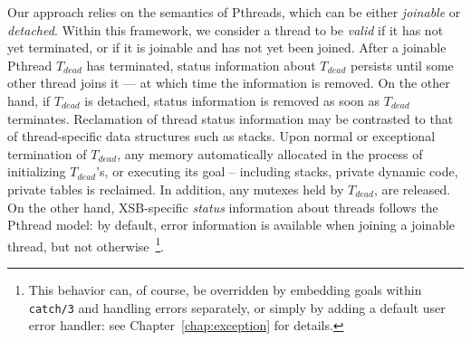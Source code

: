 Our approach relies on the semantics of Pthreads, which can be either
{\em joinable} or {\em detached}.  Within this framework, we consider
a thread to be {\em valid} if it has not yet terminated, or if it is
joinable and has not yet been joined.  After a joinable Pthread
$T_{dead}$ has terminated, status information about $T_{dead}$
persists until some other thread joins it --- at which time the
information is removed.  On the other hand, if $T_{dead}$ is detached,
status information is removed as soon as $T_{dead}$ terminates.
Reclamation of thread status information may be contrasted to that of
thread-specific data structures such as stacks.  Upon normal or
exceptional termination of $T_{dead}$, any memory automatically
allocated in the process of initializing $T_{dead}$'s, or executing
its goal -- including stacks, private dynamic code, private tables is
reclaimed.  In addition, any mutexes held by $T_{dead}$, are released.
On the other hand, XSB-specific {\em status} information about threads
follows the Pthread model: by default, error information is available
when joining a joinable thread, but not otherwise~\footnote{This
  behavior can, of course, be overridden by embedding goals within
  {\tt catch/3} and handling errors separately, or simply by adding a
  default user error handler: see Chapter~\ref{chap:exception} for
  details.}.

